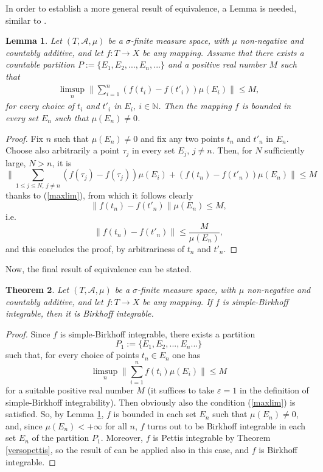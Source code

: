\documentclass[11pt,a4paper,twoside]{amsart}
\newtheorem{theorem}{Theorem}[section]
\newtheorem{lemma}[theorem]{Lemma}
\begin{document}
In order to establish a more general result of equivalence, a Lemma is needed, similar to \cite[Lemma 5]{pot2007}.
\begin{lemma}\label{flimitata}
Let $(T,\mathcal{A},\mu)$ be a $\sigma$-finite measure space, with $\mu$ non-negative and countably additive, and let $f:T\to X$ be any mapping.
Assume that there exists a countable partition $P:=\{E_1,E_2,...,E_n,...\}$ and a positive real number $M$ such that
\begin{eqnarray}\label{maxlim}
\limsup_n\|\sum_{i=1}^n(f(t_i)-f(t'_i))\mu(E_i)\|\leq M,\end{eqnarray}
for every choice of $t_i$ and $t'_i$ in $E_i,\ i\in \mathbb{N}$. Then the mapping $f$ is bounded in every set $E_n$ such that $\mu(E_n)\neq 0$. 
\end{lemma} 
\begin{proof}
Fix  $n$ such that $\mu(E_n)\neq 0$ and fix any two points $t_n$ and $t'_n$ in $E_n$. Choose also arbitrarily a point $\tau_j$  in every set $E_j$, $j\neq n$. Then, for $N$ sufficiently large, $N>n$, it is
$$\|\sum_{1\leq j\leq N, \ j\neq n}(f(\tau_j)-f(\tau_j))\mu(E_i)+(f(t_n)-f(t'_n))\mu(E_n)\|\leq M$$
thanks to (\ref{maxlim}), from which it follows clearly
$$\|f(t_n)-f(t'_n)\|\mu(E_n)\leq M,$$
i.e. 
$$\|f(t_n)-f(t'_n)\|\leq \frac{M}{\mu(E_n)},$$
and this concludes the proof, by arbitrariness of $t_n$ and $t'_n$.
\end{proof}
Now, the final result of equivalence can be stated.
\begin{theorem}\label{sBvsB}
Let $(T,\mathcal{A},\mu)$ be a $\sigma$-finite measure space, with $\mu$ non-negative and countably additive, and let $f:T\to X$ be any mapping.
If $f$ is simple-Birkhoff integrable, then it is Birkhoff integrable.
\end{theorem}
\begin{proof}
Since $f$ is simple-Birkhoff integrable, there exists a partition $$P_1:=\{E_1,E_2,...,E_n...\}$$ such that, for every choice of points $t_n\in E_n$ one has
$$\limsup_n\|\sum_{i=1}^nf(t_i)\mu(E_i)\|\leq M$$
for a suitable positive real number $M$ (it suffices to take ${\varepsilon}=1$ in the definition of simple-Birkhoff integrability). Then obviously also the condition (\ref{maxlim}) is satisfied. So, by Lemma \ref{flimitata}, $f$ is bounded in each set $E_n$ such that $\mu(E_n)\neq 0$, and, since $\mu(E_n)<+\infty$ for all $n$, $f$ turns out to be Birkhoff integrable in each set $E_n$ of the partition $P_1$. Moreover, $f$ is Pettis integrable by Theorem \ref{versopettis}, so the result of  \cite[Lemma 3.2]{cr2005} can be applied also in this case, and $f$ is Birkhoff integrable.
\end{proof}
\end{document}
